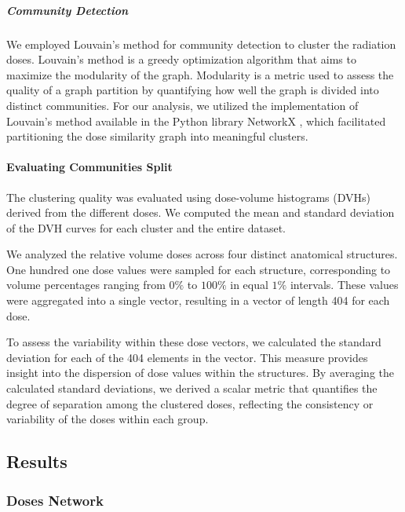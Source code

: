 \subparagraph{Community Detection}
\label{clustering_evaluation}
We employed Louvain's method for community detection to cluster the radiation doses.
Louvain's method is a greedy optimization algorithm that aims to maximize the modularity of the graph.
Modularity is a metric used to assess the quality of a graph partition by quantifying how well the graph is divided into distinct communities.
For our analysis, we utilized the implementation of Louvain's method available in the Python library NetworkX \cite{NetworkX}, which facilitated partitioning the dose similarity graph into meaningful clusters.

\paragraph{Evaluating Communities Split}
The clustering quality was evaluated using dose-volume histograms (DVHs) derived from the different doses.
We computed the mean and standard deviation of the DVH curves for each cluster and the entire dataset.

We analyzed the relative volume doses across four distinct anatomical structures.
One hundred one dose values were sampled for each structure, corresponding to volume percentages ranging from $0\%$ to $100\%$ in equal $1\%$ intervals.
These values were aggregated into a single vector, resulting in a vector of length 404 for each dose.

To assess the variability within these dose vectors, we calculated the standard deviation for each of the 404 elements in the vector.
This measure provides insight into the dispersion of dose values within the structures.
By averaging the calculated standard deviations, we derived a scalar metric that quantifies the degree of separation among the clustered doses, reflecting the consistency or variability of the doses within each group.

\subsection{Results}
\subsubsection{Doses Network}
